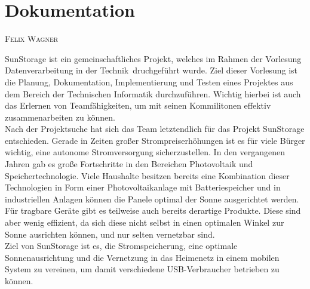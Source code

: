 \documentclass[12pt,a4paper,bibliography=totocnumbered,listof=totocnumbered]{article}
\makeatletter
\newcommand{\chapterauthor}[1]{%
  {\parindent0pt\vspace*{-5pt}%
  \linespread{1.1}\small\scshape#1%
  \par\nobreak\vspace*{3pt}}
  \@afterheading%
}
\makeatother
\begin{document}
\section{Dokumentation}\label{Dokumentation}
\chapterauthor{Felix Wagner}
SunStorage ist ein gemeinschaftliches Projekt, welches im Rahmen der Vorlesung \glqq Datenverarbeitung in der Technik\grqq \ druchgeführt wurde.
Ziel dieser Vorlesung ist die Planung, Dokumentation, Implementierung und Testen eines Projektes aus dem Bereich der Technischen Informatik durchzuführen. 
Wichtig hierbei ist auch das Erlernen von Teamfähigkeiten, um mit seinen Kommilitonen effektiv zusammenarbeiten zu können.\\
Nach der Projektsuche hat sich das Team letztendlich für das Projekt SunStorage entschieden.
Gerade in Zeiten großer Strompreiserhöhungen ist es für viele Bürger wichtig, eine autonome Stromversorgung sicherzustellen. 
In den vergangenen Jahren gab es große Fortschritte in den Bereichen Photovoltaik und Speichertechnologie. 
Viele Haushalte besitzen bereits eine Kombination dieser Technologien in Form einer Photovoltaikanlage mit Batteriespeicher und in industriellen Anlagen können die Panele optimal der Sonne ausgerichtet werden.
Für tragbare Geräte gibt es teilweise auch bereits derartige Produkte. 
Diese sind aber wenig effizient, da sich diese nicht selbst in einen optimalen Winkel 
zur Sonne ausrichten können, und nur selten vernetzbar sind.\\
Ziel von SunStorage ist es, die Stromspeicherung, eine optimale Sonnenausrichtung und die Vernetzung in das Heimenetz in einem mobilen System zu vereinen, um damit verschiedene USB-Verbraucher betrieben zu können.
\end{document}
